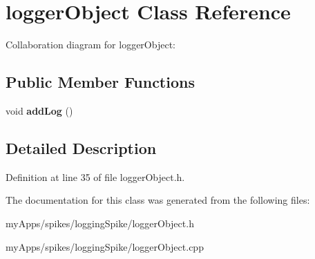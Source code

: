 \hypertarget{classloggerObject}{}\section{logger\+Object Class Reference}
\label{classloggerObject}


Collaboration diagram for logger\+Object\+:
\subsection*{Public Member Functions}
\begin{DoxyCompactItemize}
\item 
\mbox{\label{classloggerObject_a39efb08701cd5ff23c444386cc35d8c2}} 
void {\bfseries add\+Log} ()
\end{DoxyCompactItemize}


\subsection{Detailed Description}


Definition at line 35 of file logger\+Object.\+h.



The documentation for this class was generated from the following files\+:\begin{DoxyCompactItemize}
\item 
my\+Apps/spikes/logging\+Spike/logger\+Object.\+h\item 
my\+Apps/spikes/logging\+Spike/logger\+Object.\+cpp\end{DoxyCompactItemize}

